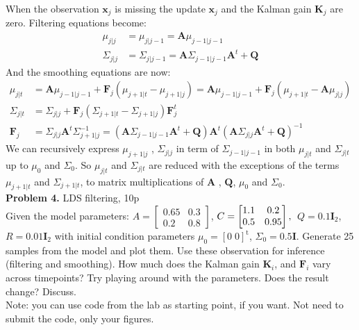 \documentclass[12pt]{article}
\newcommand{\matr}[1]{\bm{#1}}     %
\newcommand{\vect}[1]{\mathbf{#1}}
\begin{document}
When the observation $\vect{x}_j$ is missing the update  $\vect{x}_j$ and the Kalman gain $\matr{K}_j$ are zero. Filtering equations become:
\begin{align*}
			\mu_{j|j}		&= \mu_{j | j-1 }		= \matr{A}  \mu_{j-1| j-1} \\
			\Sigma_{j|j}	&= \Sigma_{j|j-1}	=  \matr{A}  \Sigma_{j-1|j-1}  \matr{A}^t  +  \matr{Q} 
\end{align*}
 And the smoothing equations are now:
\begin{align*}
			\mu_{j|t}		&=	\matr{A}  \mu_{j-1| j-1} + \matr{F}_j (\mu_{j+1|t}  - \mu_{j+1|j}) = \matr{A} \mu_{j-1|j-1}  + \matr{F}_j (\mu_{j+1|t} - \matr{A} \mu_{j|j}) \\
			\Sigma_{j|t}	&=	 \Sigma_{j|j}	+ \matr{F}_j (\Sigma_{j+1|t}  - \Sigma_{j+1|j})   \matr{F}_j^t \\
			 \matr{F}_j		&= 	\Sigma_{j|j}	 \matr{A}^t  \Sigma_{j+1|j}^{-1}	= (\matr{A}  \Sigma_{j-1|j-1}  \matr{A}^t  +  \matr{Q} )	 \matr{A}^t   
			 				(\matr{A}  \Sigma_{j|j}  \matr{A}^t  +  \matr{Q} )^{-1}	
 \end{align*}
We can recursively express $\mu_{j+1|j}$ , $\Sigma_{j|j}$ in term of $\Sigma_{j-1|j-1}$ in both $\mu_{j|t}$ and $\Sigma_{j|t}$  up to $\mu_0$ and $\Sigma_0$. 
So $\mu_{j|t}$ and  $\Sigma_{j|t}$ are reduced with the exceptions of the terms $\mu_{j+1|t}$ and $\Sigma_{j+1|t}$,  
to matrix multiplications of $\matr{A}$ , $ \matr{Q}$, $\mu_0$ and $\Sigma_0$. 
\\

\noindent \textbf{Problem 4.}  LDS filtering, 10p\\ 
Given the model parameters: $A = 
\begin{bmatrix} %
0.65 &   0.3\\
    0.2   & 0.8
\end{bmatrix}
$,
$C= 
\begin{bmatrix}  
    1.1 & 0.2\\
    0.5 & 0.95\\
\end{bmatrix},\\
$
$Q= 0.1 \vect{I}_2$, 
$R= 0.01 \vect{I}_2$ with initial condition parameters $\mu_0 = [0\; 0]^\mathrm{t}$, $\Sigma_0 = 0.5 \vect{I}$.
Generate 25 samples from the model and  plot them. Use these observation for inference (filtering and smoothing). How much does the Kalman gain $\mathbf{K}_i$, and $\mathbf{F}_i$ vary across timepoints? Try playing around with the parameters. Does the result change? Discuss.\\
Note: you can use code from the lab as starting point, if you want. Not need to submit the code, only your figures.
\\
\end{document}
